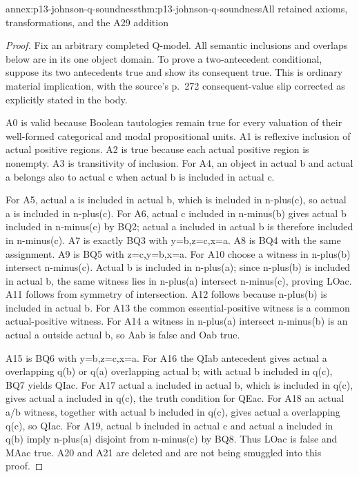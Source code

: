 \begin{annexitem}{annex:p13-johnson-q-soundness}{thm:p13-johnson-q-soundness}{All retained axioms, transformations, and the A29 addition}
\begin{proof}
Fix an arbitrary completed Q-model. All semantic inclusions and overlaps
below are in its one object domain. To prove a two-antecedent conditional,
suppose its two antecedents true and show its consequent true. This is
ordinary material implication, with the source's p.~272 consequent-value
slip corrected as explicitly stated in the body.

A0 is valid because Boolean tautologies remain true for every valuation
of their well-formed categorical and modal propositional units.
A1 is reflexive inclusion of actual positive regions. A2 is true because
each actual positive region is nonempty. A3 is transitivity of inclusion.
For A4, an object in actual b and actual a belongs also to actual c
when actual b is included in actual c.

For A5, actual a is included in actual b, which is included in n-plus(c),
so actual a is included in n-plus(c). For A6, actual c included in
n-minus(b) gives actual b included in n-minus(c) by BQ2; actual a
included in actual b is therefore included in n-minus(c).
A7 is exactly BQ3 with y=b,z=c,x=a. A8 is BQ4 with the same
assignment. A9 is BQ5 with z=c,y=b,x=a. For A10 choose a witness
in n-plus(b) intersect n-minus(c). Actual b is included in n-plus(a);
since n-plus(b) is included in actual b, the same witness lies in
n-plus(a) intersect n-minus(c), proving LOac.
A11 follows from symmetry of intersection. A12 follows because
n-plus(b) is included in actual b. For A13 the common essential-positive
witness is a common actual-positive witness. For A14 a witness in
n-plus(a) intersect n-minus(b) is an actual a outside actual b,
so Aab is false and Oab true.

A15 is BQ6 with y=b,z=c,x=a. For A16 the QIab antecedent gives
actual a overlapping q(b) or q(a) overlapping actual b; with actual b
included in q(c), BQ7 yields QIac. For A17 actual a included in
actual b, which is included in q(c), gives actual a included in q(c),
the truth condition for QEac. For A18 an actual a/b witness, together
with actual b included in q(c), gives actual a overlapping q(c),
so QIac. For A19, actual b included in actual c and actual a included
in q(b) imply n-plus(a) disjoint from n-minus(c) by BQ8.
Thus LOac is false and MAac true. A20 and A21 are deleted and
are not being smuggled into this proof.


\end{proof}
\end{annexitem}
